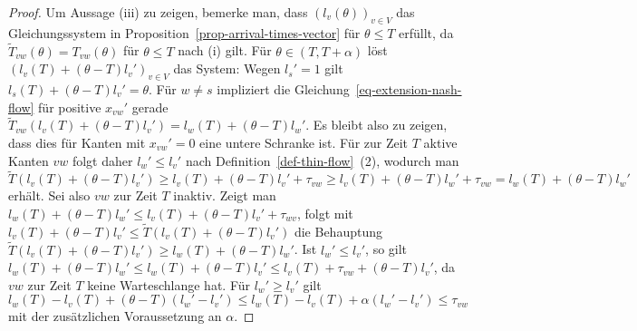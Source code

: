 \begin{proof}
	Um Aussage (iii) zu zeigen, bemerke man, dass $(l_v(\theta))_{v\in V}$ das Gleichungssystem in Proposition~\ref{prop-arrival-times-vector} für $\theta \leq T$ erfüllt, da $\tilde{T}_{vw}(\theta) = T_{vw}(\theta)$ für $\theta\leq T$ nach (i) gilt.
	Für $\theta \in (T, T+\alpha)$ löst $(l_v(T) + (\theta - T)l_v')_{v\in V}$  das System:
	Wegen $l_s' = 1$ gilt $l_s(T) + (\theta - T)l_v' = \theta$.
	Für $w\neq s$ impliziert die Gleichung~\ref{eq-extension-nash-flow} für positive $x_{vw}'$ gerade $\tilde{T}_{vw}(l_v(T) + (\theta-T)l_v') = l_w(T) + (\theta - T) l_w'$.
	Es bleibt also zu zeigen, dass dies für Kanten mit $x_{vw}' = 0$ eine untere Schranke ist.
	Für zur Zeit $T$ aktive Kanten $vw$ folgt daher $l_w'\leq l_v'$ nach Definition~\ref{def-thin-flow}~(2), wodurch man $\tilde{T}(l_v(T) + (\theta - T)l_v')\geq l_v(T) + (\theta - T)l_v' + \tau_{vw}\geq l_v(T) + (\theta - T)l_w' + \tau_{vw} = l_w(T) + (\theta-T)l_w'$ erhält.
	Sei also $vw$ zur Zeit $T$ inaktiv.
	Zeigt man $l_w(T) + (\theta - T)l_w' \leq l_v(T) + (\theta - T)l_v' + \tau_{wv}$, folgt mit $l_v(T) + (\theta - T)l_v' \leq \tilde{T}(l_v(T) + (\theta - T)l_v')$ die Behauptung
	$\tilde{T}(l_v(T) + (\theta - T) l_v') \geq l_w(T) + (\theta - T)l_w'$.
	Ist $l_w' \leq l_v'$, so gilt $l_w(T) +(\theta - T)l_w' \leq l_w(T) + (\theta - T)l_v' \leq l_v(T) + \tau_{vw} + (\theta - T)l_v'$, da $vw$ zur Zeit $T$ keine Warteschlange hat.
	Für $l_w' \geq l_v'$ gilt $l_w(T) - l_v(T) + (\theta - T) (l_w' - l_v') \leq l_w(T) - l_v(T) + \alpha (l_w' - l_v') \leq \tau_{vw}$ mit der zusätzlichen Voraussetzung an $\alpha$.
\end{proof}
